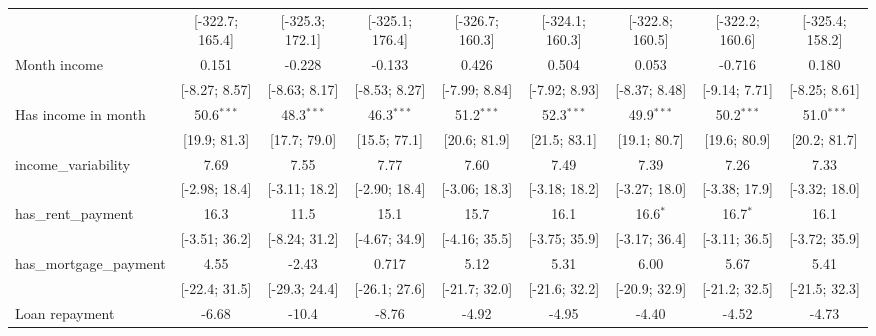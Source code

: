 \begin{table}[htbp]
\begin{threeparttable}[b]
\begin{tabular}{lcccccccc}
                                     & [-322.7; 165.4] & [-325.3; 172.1] & [-325.1; 176.4] & [-326.7; 160.3] & [-324.1; 160.3] & [-322.8; 160.5] & [-322.2; 160.6] & [-325.4; 158.2]\\   
         Month income                & 0.151           & -0.228          & -0.133          & 0.426           & 0.504           & 0.053           & -0.716          & 0.180\\   
                                     & [-8.27; 8.57]   & [-8.63; 8.17]   & [-8.53; 8.27]   & [-7.99; 8.84]   & [-7.92; 8.93]   & [-8.37; 8.48]   & [-9.14; 7.71]   & [-8.25; 8.61]\\   
         Has income in month         & 50.6$^{***}$    & 48.3$^{***}$    & 46.3$^{***}$    & 51.2$^{***}$    & 52.3$^{***}$    & 49.9$^{***}$    & 50.2$^{***}$    & 51.0$^{***}$\\   
                                     & [19.9; 81.3]    & [17.7; 79.0]    & [15.5; 77.1]    & [20.6; 81.9]    & [21.5; 83.1]    & [19.1; 80.7]    & [19.6; 80.9]    & [20.2; 81.7]\\   
         income\_variability         & 7.69            & 7.55            & 7.77            & 7.60            & 7.49            & 7.39            & 7.26            & 7.33\\   
                                     & [-2.98; 18.4]   & [-3.11; 18.2]   & [-2.90; 18.4]   & [-3.06; 18.3]   & [-3.18; 18.2]   & [-3.27; 18.0]   & [-3.38; 17.9]   & [-3.32; 18.0]\\   
         has\_rent\_payment          & 16.3            & 11.5            & 15.1            & 15.7            & 16.1            & 16.6$^{*}$      & 16.7$^{*}$      & 16.1\\   
                                     & [-3.51; 36.2]   & [-8.24; 31.2]   & [-4.67; 34.9]   & [-4.16; 35.5]   & [-3.75; 35.9]   & [-3.17; 36.4]   & [-3.11; 36.5]   & [-3.72; 35.9]\\   
         has\_mortgage\_payment      & 4.55            & -2.43           & 0.717           & 5.12            & 5.31            & 6.00            & 5.67            & 5.41\\   
                                     & [-22.4; 31.5]   & [-29.3; 24.4]   & [-26.1; 27.6]   & [-21.7; 32.0]   & [-21.6; 32.2]   & [-20.9; 32.9]   & [-21.2; 32.5]   & [-21.5; 32.3]\\   
         Loan repayment              & -6.68           & -10.4           & -8.76           & -4.92           & -4.95           & -4.40           & -4.52           & -4.73\\   

\end{tabular}
\end{threeparttable}
\end{table}
